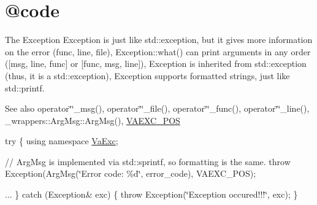 \hypertarget{_0Dcode-example}{}\section{@code}
The Exception Exception is just like std\+::exception, but it gives more information on the error (func, line, file), Exception\+::what() can print arguments in any order (\mbox{[}msg, line, func\mbox{]} or \mbox{[}func, msg, line\mbox{]}), Exception is inherited from std\+::exception (thus, it is a std\+::exception), Exception supports formatted strings, just like std\+::printf.

\begin{DoxySeeAlso}{See also}
operator\char`\"{}\char`\"{}\+\_\+msg(), operator\char`\"{}\char`\"{}\+\_\+file(), operator\char`\"{}\char`\"{}\+\_\+func(), operator\char`\"{}\char`\"{}\+\_\+line(), \+\_\+wrappers\+::\+Arg\+Msg\+::\+Arg\+Msg(), \hyperlink{_va_exception_8hpp_ac9726d8d8da9d73a6156a2125ec48ff3}{V\+A\+E\+X\+C\+\_\+\+P\+OS}
\end{DoxySeeAlso}
try \{ using namespace \hyperlink{namespace_va_exc}{Va\+Exc};

// Arg\+Msg is implemented via std\+::sprintf, so formatting is the same. throw Exception(Arg\+Msg(\char`\"{}\+Error code\+: \%d\char`\"{}, error\+\_\+code), V\+A\+E\+X\+C\+\_\+\+P\+OS);

... \} catch (Exception\& exc) \{ throw Exception(\char`\"{}\+Exception occured!!!\char`\"{}, exc); \} 


\begin{DoxyCodeInclude}
\end{DoxyCodeInclude}
 